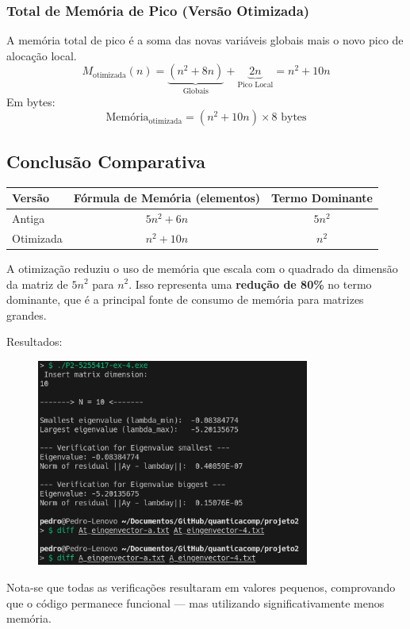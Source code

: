\documentclass[12pt, a4paper]{article} %
\begin{document}
            \subsubsection*{Total de Mem\'oria de Pico (Vers\~ao Otimizada)}
            A mem\'oria total de pico \'e a soma das novas vari\'aveis globais mais o novo pico de aloca\c{c}\~ao local.
            \[
            M_{\text{otimizada}}(n) = \underbrace{(n^2 + 8n)}_{\text{Globais}} + \underbrace{2n}_{\text{Pico Local}} = n^2 + 10n
            \]
            Em bytes:
            \[
            \text{Mem\'oria}_{\text{otimizada}} = (n^2 + 10n) \times 8 \text{ bytes}
            \]

            \subsection*{Conclus\~ao Comparativa}

            \begin{table}[h!]
            \centering
            \begin{tabular}{|l|c|c|}
            \hline
            \textbf{Vers\~ao} & \textbf{F\'ormula de Mem\'oria (elementos)} & \textbf{Termo Dominante} \\
            \hline
            Antiga & $5n^2 + 6n$ & $5n^2$ \\
            Otimizada & $n^2 + 10n$ & $n^2$ \\
            \hline
            \end{tabular}
            \end{table}

            A otimiza\c{c}\~ao reduziu o uso de mem\'oria que escala com o quadrado da dimens\~ao da matriz de $5n^2$ para $n^2$. Isso representa uma \textbf{redu\c{c}\~ao de 80\%} no termo dominante, que \'e a principal fonte de consumo de mem\'oria para matrizes grandes.

        Resultados:
        \begin{figure}[H]
            \centering
            \includegraphics[width=0.8\textwidth]{../images/ex4.png}
        \end{figure}

        Nota-se que todas as verifica\c{c}\~oes resultaram em valores pequenos, comprovando que o c\'odigo permanece funcional ---  mas utilizando significativamente menos mem\'oria.
\end{document}
